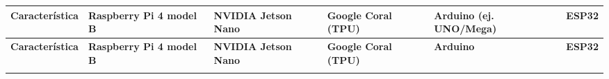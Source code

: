 
{\small
  \begin{longtable}[c]{p{2.2cm} p{2.4cm} p{2.4cm} p{2.4cm} p{2.4cm} p{2.4cm}}
    \hline
    \textbf{Característica}                                                                                                                                &
    \textbf{Raspberry Pi 4 model B}                                                                                                                        &
    \textbf{NVIDIA Jetson Nano}                                                                                                                            &
    \textbf{Google Coral (TPU)}                                                                                                                            &
    \textbf{Arduino (ej. UNO/Mega)}                                                                                                                        &
    \textbf{ESP32}                                                                                                                                           \\
    \hline
    \endfirsthead

    \hline
    \textbf{Característica}                                                                                                                                &
    \textbf{Raspberry Pi 4 model B}                                                                                                                        &
    \textbf{NVIDIA Jetson Nano}                                                                                                                            &
    \textbf{Google Coral (TPU)}                                                                                                                            &
    \textbf{Arduino}                                                                                                                        &
    \textbf{ESP32}                                                                                                                                           \\
    \hline
    \endhead
    \endfoot
    \endlastfoot


\end{longtable}}
